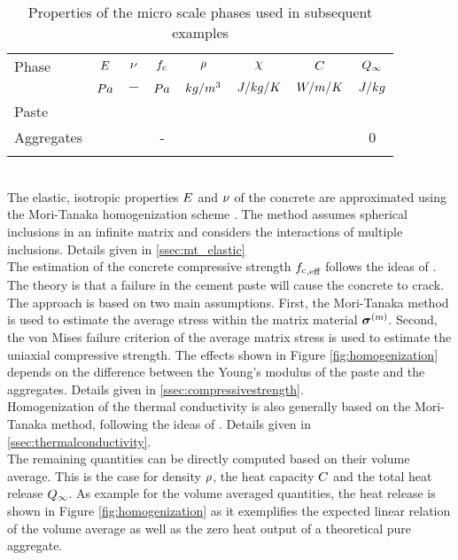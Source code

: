 \begin{table}[ht]
	\begin{center}
		\begin{minipage}{.9\textwidth}
			\caption{Properties of the micro scale phases used in subsequent examples}\label{tab:homogenizationproperties}
			\begin{tabular}{lccccccc}
				\toprule
				Phase & $E$ & $\nu$ & $f_{\text{c}}$ & $\rho$ & $\chi$ & $C$ & $Q_{\infty}$\\
				  & $Pa$  & $-$  & $Pa$  & $kg/m^3$  & $J/kg/K$  & $W/m/K$  &  $J/kg$ \\
				\midrule
			Paste	& \pasteE & \pastenu & \pastefc & \pasterho & \pasteC & \pastekappa &  \pasteQ \\
			Aggregates	& \aggregatesE & \aggregatesnu & - & \aggregatesrho & \aggregatesC & \aggregateskappa &  0 \\
				\botrule
			\end{tabular}
		\end{minipage}
	\end{center}
		
\end{table}
\\
The elastic, isotropic properties $E$ and $\nu$ of the concrete are approximated using the Mori-Tanaka homogenization scheme \cite{mor_1973_asi}.
The method assumes spherical inclusions in an infinite matrix and considers the interactions of multiple inclusions. Details given in \ref{ssec:mt_elastic}\\
The estimation of the concrete compressive strength ${f_{\text{c}}}_{,\text{eff}}$ follows the ideas of \cite{nev_2018_mcam}.
The theory is that a failure in the cement paste will cause the concrete to crack.
The approach is based on two main assumptions.
First, the Mori-Tanaka method is used to estimate the average stress within the matrix material $\boldsymbol{\sigma}^{(\text{m})}$. 
Second, the von Mises failure criterion of the average matrix stress is used to estimate the uniaxial compressive strength.
The effects shown in Figure \ref{fig:homogenization} depends on the difference between the Young's modulus of the paste and the aggregates. Details given in \ref{ssec:compressivestrength}.\\
Homogenization of the thermal conductivity is also generally based on the Mori-Tanaka method, following the ideas of \cite{str_2011_mbeo}. Details given in \ref{ssec:thermalconductivity}.\\
The remaining quantities can be directly computed based on their volume average.
This is the case for density $\rho$, the heat capacity $C$ and the total heat release $Q_{\infty}$.
As example for the volume averaged quantities, the heat release is shown in Figure \ref{fig:homogenization} as it exemplifies the expected linear relation of the volume average as well as the zero heat output of a theoretical pure aggregate.